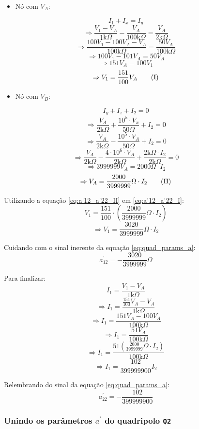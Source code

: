 \documentclass{report}
\begin{document}
\begin{itemize}
  \item Nó com $ V_A $:
\end{itemize}
$$ I_1 + I_x = I_y $$
$$ \Rightarrow \frac{V_1 - V_A}{1\text{k}\Omega} - \frac{V_A}{100\text{k}\Omega} = \frac{V_A}{2\text{k}\Omega} $$
$$ \Rightarrow \frac{100V_1 - 100V_A - V_A}{100\text{k}\Omega} = \frac{50V_A}{100\text{k}\Omega} $$
$$ \Rightarrow 100V_1 - 101V_A = 50V_A $$
$$ \Rightarrow 151V_A = 100V_1 $$
\begin{equation}
  \label{eq:a'12_a'22_I}
  \centering
  \Rightarrow V_1 = \frac{151}{100}V_A \tag{I}
\end{equation}

\begin{itemize}
  \item Nó com $ V_B $:
\end{itemize}
$$ I_y + I_z + I_2 = 0 $$
$$ \Rightarrow \frac{V_A}{2\text{k}\Omega} + \frac{10^5 \cdot V_x}{50\Omega} + I_2 = 0 $$
$$ \Rightarrow \frac{V_A}{2\text{k}\Omega} - \frac{10^5 \cdot V_A}{50\Omega} + I_2 = 0 $$
$$ \Rightarrow \frac{V_A}{2\text{k}\Omega} - \frac{4 \cdot 10^6 \cdot V_A}{2\text{k}\Omega} + \frac{2\text{k}\Omega \cdot I_2}{2\text{k}\Omega} = 0 $$
$$ \Rightarrow 3999999V_A = 2000\Omega \cdot I_2 $$
\begin{equation}
  \label{eq:a'12_a'22_II}
  \centering
  \Rightarrow V_A = \frac{2000}{3999999} \Omega \cdot I_2 \tag{II}
\end{equation}

Utilizando a equação \ref{eq:a'12_a'22_II} em \ref{eq:a'12_a'22_I}:
$$ V_1 = \frac{151}{100} \cdot \left( \frac{2000}{3999999} \Omega \cdot I_2 \right) $$
$$ \Rightarrow V_1 = \frac{3020}{3999999} \Omega \cdot I_2 $$

Cuidando com o sinal inerente da equação \ref{eq:quad_params_a}:
$$ a^{'}_{12} = - \frac{3020}{3999999} \Omega $$

Para finalizar:
$$ I_1 = \frac{V_1 - V_A}{1\text{k}\Omega} $$
$$ \Rightarrow I_1 = \frac{\frac{151}{100}V_A - V_A}{1\text{k}\Omega} $$
$$ \Rightarrow I_1 = \frac{151V_A - 100V_A}{100\text{k}\Omega} $$
$$ \Rightarrow I_1 = \frac{51V_A}{100\text{k}\Omega} $$
$$ \Rightarrow I_1 = \frac{51\left( \frac{2000}{3999999} \Omega \cdot I_2 \right)}{100\text{k}\Omega} $$
$$ \Rightarrow I_1 = \frac{102}{399999900} I_2 $$

Relembrando do sinal da equação \ref{eq:quad_params_a}:
$$ a^{'}_{22} = - \frac{102}{399999900} $$

\subsubsection{Unindo os parâmetros $ a^{'} $ do quadripolo \texttt{Q2}}
\end{document}
